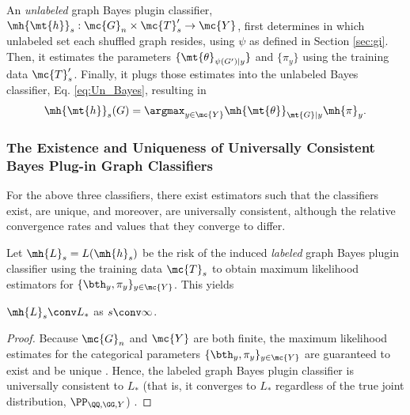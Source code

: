 \documentclass[10pt,journal,cspaper,compsoc]{IEEEtran}
\begin{document}
An \emph{unlabeled} graph Bayes plugin classifier,
$\mh{\mt{h}}_s: \mc{G}_n \times \mc{T}_s' \to \mc{Y}$,
first determines in which unlabeled set each shuffled graph resides, using $\psi$ as defined in Section \ref{sec:gi}.  Then, it estimates the parameters $\{\mt{\theta}_{\psi(G')|y}\}$ and $\{\pi_y\}$ using the training data $\mc{T}_s'$. Finally, it plugs those estimates into the unlabeled Bayes classifier, Eq. \eqref{eq:Un_Bayes}, resulting in
\begin{align} \label{eq:Sh_Plug}
	\mh{\mt{h}}_s(G)=\argmax_{y\in\mc{Y}} \mh{\mt{\theta}}_{\mt{G}|y}\mh{\pi}_y.
\end{align}


\subsubsection{The Existence and Uniqueness of Universally Consistent Bayes Plug-in Graph Classifiers} %
\label{sub:bayes_plug_in_classifiers_are_consistent}


For the above three classifiers, there exist estimators such that the classifiers exist, are unique, and moreover, are universally consistent, although the relative convergence rates and values that they converge to differ.

Let $\mh{L}_s=L(\mh{h}_s)$ be the risk of the induced \emph{labeled} graph Bayes plugin classifier using the training data $\mc{T}_s$ to obtain maximum likelihood estimators for $\{\bth_y,\pi_y\}_{y \in \mc{Y}}$.  This yields
\begin{thm} \label{thm:4}
	$\mh{L}_s \conv L_*$ as $s \conv \infty$.
\end{thm}
\begin{proof}
Because ${\mc{G}}_n$ and $\mc{Y}$ are both finite, the maximum likelihood estimates for the categorical parameters $\{\bth_y,\pi_y\}_{y \in \mc{Y}}$ are guaranteed to exist and be unique \cite{Devroye1996}.  Hence, the labeled graph Bayes plugin classifier is universally consistent to ${L}_*$ (that is, it converges to ${L}_*$ regardless of the true joint distribution, $\PP_{\QQ, \GG ,Y}$) \cite{Devroye1996}. 
\end{proof}
\end{document}
